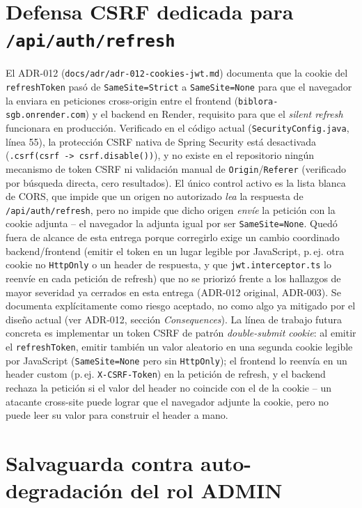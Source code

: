 \section{Defensa CSRF dedicada para \texttt{/api/auth/refresh}}
\label{sec:tf-csrf}

El ADR-012 (\texttt{docs/adr/adr-012-cookies-jwt.md}) documenta que la
cookie del \texttt{refreshToken} pasó de \texttt{SameSite=Strict} a
\texttt{SameSite=None} para que el navegador la enviara en peticiones
cross-origin entre el frontend
(\texttt{biblora-sgb.onrender.com}) y el backend en Render, requisito
para que el \emph{silent refresh} funcionara en producción. Verificado
en el código actual (\texttt{SecurityConfig.java}, línea 55), la
protección CSRF nativa de Spring Security está desactivada
(\texttt{.csrf(csrf -> csrf.disable())}), y no existe en el
repositorio ningún mecanismo de token CSRF ni validación manual de
\texttt{Origin}/\texttt{Referer} (verificado por búsqueda directa, cero
resultados). El único control activo es la lista blanca de CORS, que
impide que un origen no autorizado \emph{lea} la respuesta de
\texttt{/api/auth/refresh}, pero no impide que dicho origen
\emph{envíe} la petición con la cookie adjunta -- el navegador la
adjunta igual por ser \texttt{SameSite=None}. Quedó fuera de alcance de
esta entrega porque corregirlo exige un cambio coordinado
backend/frontend (emitir el token en un lugar legible por JavaScript,
p.\,ej. otra cookie no \texttt{HttpOnly} o un header de respuesta, y
que \texttt{jwt.interceptor.ts} lo reenvíe en cada petición de refresh)
que no se priorizó frente a los hallazgos de mayor severidad ya
cerrados en esta entrega (ADR-012 original, ADR-003). Se documenta
explícitamente como riesgo aceptado, no como algo ya mitigado por el
diseño actual (ver ADR-012, sección \emph{Consequences}). La línea de
trabajo futura concreta es implementar un token CSRF de patrón
\emph{double-submit cookie}: al emitir el \texttt{refreshToken}, emitir
también un valor aleatorio en una segunda cookie legible por
JavaScript (\texttt{SameSite=None} pero sin \texttt{HttpOnly}); el
frontend lo reenvía en un header custom (p.\,ej.
\texttt{X-CSRF-Token}) en la petición de refresh, y el backend rechaza
la petición si el valor del header no coincide con el de la cookie --
un atacante cross-site puede lograr que el navegador adjunte la cookie,
pero no puede leer su valor para construir el header a mano.

\section{Salvaguarda contra auto-degradación del rol ADMIN}

